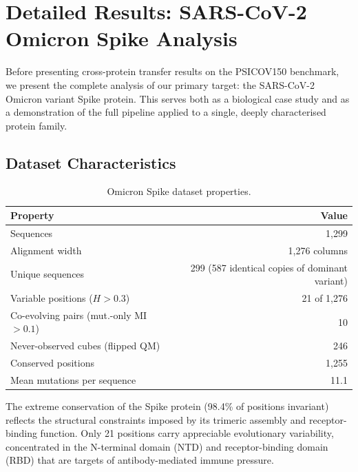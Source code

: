 \section{Detailed Results: SARS-CoV-2 Omicron Spike Analysis}
\label{sec:results-spike}

Before presenting cross-protein transfer results on the PSICOV150 benchmark,
we present the complete analysis of our primary target: the SARS-CoV-2
Omicron variant Spike protein.  This serves both as a biological case study
and as a demonstration of the full pipeline applied to a single, deeply
characterised protein family.

\subsection{Dataset Characteristics}
\begin{table}[ht]
	\centering
	\caption{Omicron Spike dataset properties.}
	\label{tab:spike-data}
	\begin{tabular}{lr}
		\toprule
		Property                                 & Value                                          \\
		\midrule
		Sequences                                & 1{,}299                                        \\
		Alignment width                          & 1{,}276 columns                                \\
		Unique sequences                         & 299 (587 identical copies of dominant variant) \\
		Variable positions ($H > 0.3$)           & 21 of 1{,}276                                  \\
		Co-evolving pairs (mut.-only MI $> 0.1$) & 10                                             \\
		Never-observed cubes (flipped QM)        & 246                                            \\
		Conserved positions                      & 1{,}255                                        \\
		Mean mutations per sequence              & 11.1                                           \\
		\bottomrule
	\end{tabular}
\end{table}

The extreme conservation of the Spike protein (98.4\% of positions invariant)
reflects the structural constraints imposed by its trimeric assembly and
receptor-binding function.  Only 21 positions carry appreciable evolutionary
variability, concentrated in the N-terminal domain (NTD) and receptor-binding
domain (RBD) that are targets of antibody-mediated immune pressure.

